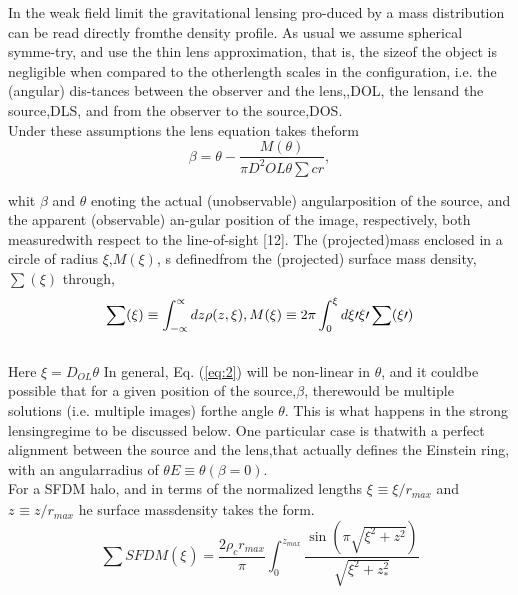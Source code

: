 \documentclass[10pt]{article}
\begin{document}
\begin{multicols}{2}
In  the  weak  field  limit  the  gravitational  lensing  pro-duced by a mass distribution can be read directly fromthe density profile.  As usual we assume spherical symme-try, and use the thin lens approximation, that is, the sizeof  the  object  is  negligible  when  compared  to  the  otherlength scales in the configuration, i.e.  the (angular) dis-tances between the observer and the lens,,DOL, the lensand the source,DLS, and from the observer to the source,DOS.\\
	Under these assumptions the lens equation takes theform \\
	\begin{equation}\label{eq:2}
		\beta=\theta-\frac{M(\theta)}{\pi D^{2}{OL}\theta\sum{cr}},
	\end{equation}
	
whit \(\beta\) and \(\theta\) enoting the actual (unobservable) angularposition of the source, and the apparent (observable) an-gular position of the image, respectively, both measuredwith  respect  to  the  line-of-sight  [12].   The  (projected)mass  enclosed  in  a  circle  of  radius \(\xi\),\(M (\xi)\), s  definedfrom the (projected) surface mass density, \(\sum(\xi)\) through,\\
   \begin{equation}\label{eq:3}
   	\sum(\xi)\equiv\int_{-\propto}^{\propto}dz \rho(z,\xi), \\ M(\xi)\equiv2\pi\int_{0}^{\xi}d\xi\prime\xi\prime\sum(\xi\prime)
   \end{equation}\\
   
Here \(\xi=D_{OL}\theta\) In general, Eq. (\ref{eq:2}) will be non-linear in \(\theta\), and it couldbe possible that for a given position of the source,\(\beta\), therewould  be  multiple  solutions  (i.e.   multiple  images)  forthe angle \(\theta\).  This is what happens in the strong lensingregime to be discussed below.  One particular case is thatwith a perfect alignment between the source and the lens,that actually defines the Einstein ring, with an angularradius of \(\theta E \equiv \theta(\beta=0)\).\\
For  a  SFDM  halo,  and  in  terms  of  the  normalized lengths \(\xi_{}\equiv \xi/ r_{max}\) and \(z_{}\equiv z/r_{max}\) he surface massdensity takes the form.\\
\begin{equation}\label{eq:4} 
	\sum SFDM(\xi_{}) = \frac{2 \rho_{c} r_{max}}{\pi} \int_{0}^{z_{max}}\frac{\sin(\pi \sqrt{\xi^{2}_{}+z^{2}_{}})}{\sqrt{\xi^{2}_{}+z^{2}_{*}}} 
\end{equation}\\


\end{multicols}
\end{document}
